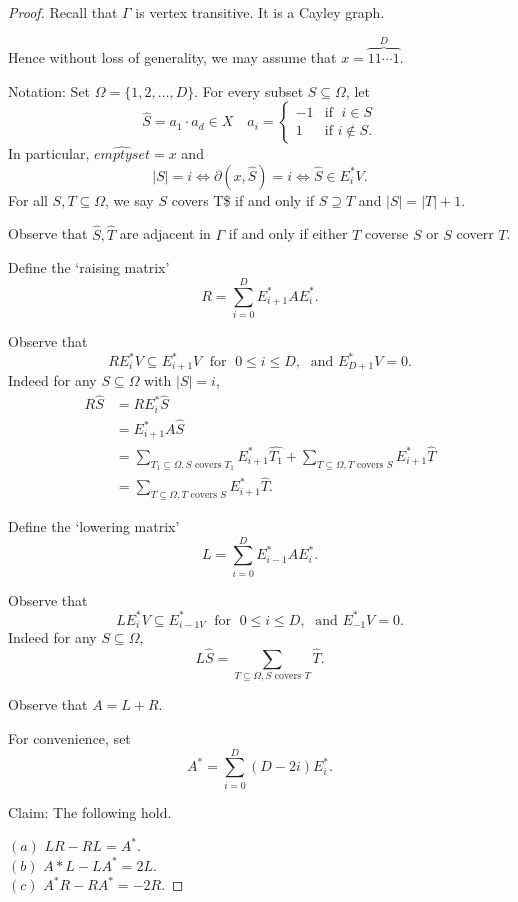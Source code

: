 \documentclass[
]{book}
\theoremstyle{definition}
\theoremstyle{definition}
\theoremstyle{definition}
\theoremstyle{definition}
\theoremstyle{remark}
\begin{document}
\begin{proof}
Recall that \(\Gamma\) is vertex transitive. It is a Cayley graph.

Hence without loss of generality, we may assume that
\(x = \overbrace{11\cdots 1}^{D}\).

Notation: Set \(\Omega = \{1, 2, \ldots, D\}\). For every subset \(S \subseteq \Omega\), let
\[\hat{S} = a_1\cdot a_d \in X \quad a_i = \begin{cases} -1 & \text{if }\; i\in S\\ 1 & \text{if } i\not\in S.\end{cases}\]
In particular, \(\hat{emptyset} = x\) and
\[|S| = i \Leftrightarrow \partial(x, \hat{S}) = i \Leftrightarrow \hat{S}\in E^*_iV.\]
For all \(S, T\subseteq \Omega\), we say \(S\) covers T\$ if and only if \(S\supseteq T\) and \(|S| = |T| +1\).

Observe that \(\hat{S}, \hat{T}\) are adjacent in \(\Gamma\) if and only if either \(T\) coverse \(S\) or \(S\) coverr \(T\).

Define the `raising matrix'
\[R = \sum_{i=0}^D E^*_{i+1}AE^*_i.\]

Observe that
\[RE_i^*V \subseteq E^*_{i+1}V \; \text{ for }\; 0\leq i \leq D, \; \text{ and }E^*_{D+1}V = 0.\]
Indeed for any \(S\subseteq \Omega\) with \(|S| = i\),
\begin{align}
R\hat{S} & = RE^*_i\hat{S} \\
& = E^*_{i+1}A\hat{S} \\
& = \sum_{T_1 \subseteq \Omega, S \text{ covers }T_1} E^*_{i+1}\widehat{T_1} + \sum_{T \subseteq \Omega, T \text{ covers }S} E^*_{i+1}\hat{T}\\
& = \sum_{T \subseteq \Omega, T \text{ covers }S} E^*_{i+1}\hat{T}.
\end{align}

Define the `lowering matrix'
\[L = \sum_{i=0}^D E^*_{i-1}AE^*_i.\]

Observe that
\[LE_i^*V \subseteq E^*_{i-1V} \; \text{ for }\; 0\leq i \leq D, \; \text{ and }E^*_{-1}V = 0.\]
Indeed for any \(S\subseteq \Omega\),
\[L\hat{S} = \sum_{T\subseteq \Omega, S \text{ covers }T} \hat{T}.\]

Observe that \(A = L + R\).

For convenience, set
\[A^* = \sum_{i=0}^D (D-2i)E_i^*.\]

Claim: The following hold.

\((a)\) \(LR - RL = A^*\).\\
\((b)\) \(A*L - LA^* = 2L\).\\
\((c)\) \(A^*R - RA^* = -2R\).


\end{proof}
\end{document}
